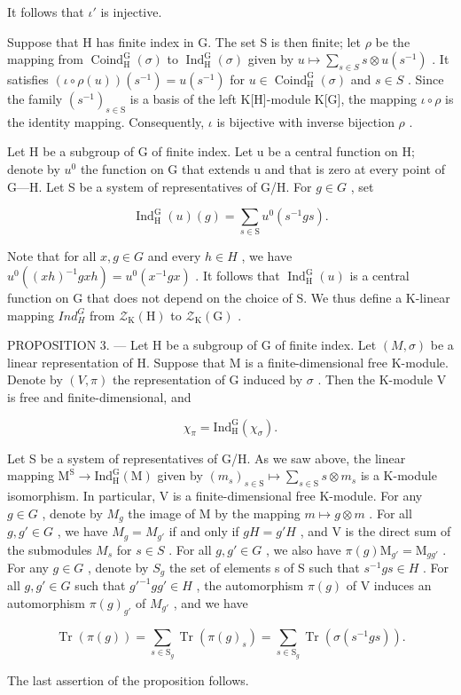 It follows that \(\iota'\) is injective.

Suppose that H has finite index in G. The set S is then finite; let \(\rho\) be the mapping from \(\operatorname{Coind}_{\mathrm{H}}^{\mathrm{G}}(\sigma)\) to \(\operatorname{Ind}_{\mathrm{H}}^{\mathrm{G}}(\sigma)\) given by \(u \mapsto \sum_{s \in S} s \otimes u(s^{-1})\) . It satisfies \((\iota \circ \rho(u))(s^{-1}) = u(s^{-1})\) for \(u \in \operatorname{Coind}_{\mathrm{H}}^{\mathrm{G}}(\sigma)\) and \(s \in S\) . Since the family \((s^{-1})_{s\in\mathrm{S}}\) is a basis of the left K{[}H{]}-module K{[}G{]}, the mapping \(\iota\circ\rho\) is the identity mapping. Consequently, \(\iota\) is bijective with inverse bijection \(\rho\) .

Let H be a subgroup of G of finite index. Let u be a central function on H; denote by \(u^{0}\) the function on G that extends u and that is zero at every point of G---H. Let S be a system of representatives of G/H. For \(g \in G\) , set

\[
\operatorname{Ind} _ {\mathrm{H}} ^ {\mathrm{G}} (u) (g) = \sum_ {s \in \mathrm{S}} u ^ {0} (s ^ {- 1} g s).\tag{4}
\]

Note that for all \(x, g \in G\) and every \(h \in H\) , we have \(u^{0}((xh)^{-1}gxh) = u^{0}(x^{-1}gx)\) . It follows that \(\operatorname{Ind}_{\mathrm{H}}^{\mathrm{G}}(u)\) is a central function on G that does not depend on the choice of S. We thus define a K-linear mapping \(Ind_{H}^{G}\) from \(\mathcal{Z}_{\mathrm{K}}(\mathrm{H})\) to \(\mathcal{Z}_{\mathrm{K}}(\mathrm{G})\) .

PROPOSITION 3. --- Let H be a subgroup of G of finite index. Let \((M,\sigma)\) be a linear representation of H. Suppose that M is a finite-dimensional free K-module. Denote by \((V,\pi)\) the representation of G induced by \(\sigma\) . Then the K-module V is free and finite-dimensional, and

\[
\chi_ {\pi} = \mathrm{Ind} _ {\mathrm{H}} ^ {\mathrm{G}} (\chi_ {\sigma}).\tag{5}
\]

Let S be a system of representatives of G/H. As we saw above, the linear mapping \(\mathrm{M}^{\mathrm{S}}\to\mathrm{Ind}_{\mathrm{H}}^{\mathrm{G}}(\mathrm{M})\) given by \((m_{s})_{s\in\mathrm{S}}\mapsto\sum_{s\in\mathrm{S}}s\otimes m_{s}\) is a K-module isomorphism. In particular, V is a finite-dimensional free K-module. For any \(g\in G\) , denote by \(M_{g}\) the image of M by the mapping \(m\mapsto g\otimes m\) . For all \(g,g'\in G\) , we have \(M_{g}=M_{g'}\) if and only if \(gH=g'H\) , and V is the direct sum of the submodules \(M_{s}\) for \(s\in S\) . For all \(g,g'\in G\) , we also have \(\pi(g)\mathrm{M}_{g'}=\mathrm{M}_{gg'}\) . For any \(g\in G\) , denote by \(S_{g}\) the set of elements s of S such that \(s^{-1}gs\in H\) . For all \(g,g'\in G\) such that \(g'^{-1}gg'\in H\) , the automorphism \(\pi(g)\) of V induces an automorphism \(\pi(g)_{g'}\) of \(M_{g'}\) , and we have

\[
\operatorname{Tr} (\pi (g)) = \sum_ {s \in \mathrm{S} _ {g}} \operatorname{Tr} (\pi (g) _ {s}) = \sum_ {s \in \mathrm{S} _ {g}} \operatorname{Tr} (\sigma (s ^ {- 1} g s)).
\]

The last assertion of the proposition follows.

